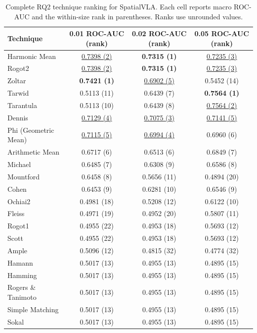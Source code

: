 \begin{table}[t]
\centering
\caption{Complete RQ2 technique ranking for SpatialVLA. Each cell reports macro ROC-AUC and the within-size rank in parentheses. Ranks use unrounded values.}
\label{tab:rq2-supplementary-spatialvla}
{\scriptsize
\setlength{\tabcolsep}{7pt}
\renewcommand{\arraystretch}{0.96}
\begin{tabular}{lccc}
\toprule
Technique & 0.01 ROC-AUC (rank) & 0.02 ROC-AUC (rank) & 0.05 ROC-AUC (rank) \\
\midrule
Harmonic Mean & \underline{0.7398 (2)} & \textbf{0.7315 (1)} & \underline{0.7235 (3)} \\
Rogot2 & \underline{0.7398 (2)} & \textbf{0.7315 (1)} & \underline{0.7235 (3)} \\
Zoltar & \textbf{0.7421 (1)} & \underline{0.6902 (5)} & 0.5452 (14) \\
Tarwid & 0.5113 (11) & 0.6439 (7) & \textbf{0.7564 (1)} \\
Tarantula & 0.5113 (10) & 0.6439 (8) & \underline{0.7564 (2)} \\
Dennis & \underline{0.7129 (4)} & \underline{0.7075 (3)} & \underline{0.7141 (5)} \\
Phi (Geometric Mean) & \underline{0.7115 (5)} & \underline{0.6994 (4)} & 0.6960 (6) \\
Arithmetic Mean & 0.6717 (6) & 0.6513 (6) & 0.6849 (7) \\
Michael & 0.6485 (7) & 0.6308 (9) & 0.6586 (8) \\
Mountford & 0.6458 (8) & 0.5656 (11) & 0.4894 (20) \\
Cohen & 0.6453 (9) & 0.6281 (10) & 0.6546 (9) \\
Ochiai2 & 0.4981 (18) & 0.5208 (12) & 0.6122 (10) \\
Fleiss & 0.4971 (19) & 0.4952 (20) & 0.5807 (11) \\
Rogot1 & 0.4955 (22) & 0.4953 (18) & 0.5693 (12) \\
Scott & 0.4955 (22) & 0.4953 (18) & 0.5693 (12) \\
Ample & 0.5096 (12) & 0.4815 (32) & 0.4774 (32) \\
Hamann & 0.5017 (13) & 0.4955 (13) & 0.4895 (15) \\
Hamming & 0.5017 (13) & 0.4955 (13) & 0.4895 (15) \\
Rogers \& Tanimoto & 0.5017 (13) & 0.4955 (13) & 0.4895 (15) \\
Simple Matching & 0.5017 (13) & 0.4955 (13) & 0.4895 (15) \\
Sokal & 0.5017 (13) & 0.4955 (13) & 0.4895 (15) \\

\end{tabular}}
\end{table}
